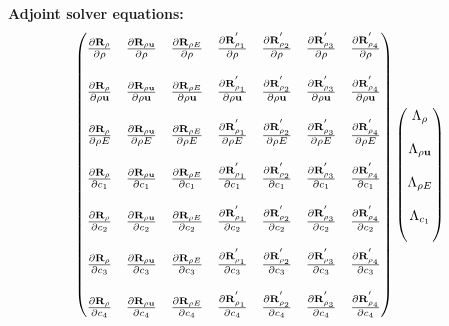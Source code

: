 \documentclass[a4paper]{article}
\begin{document}
\begin{landscape}
\begin{huge}
  \newpage
  \bf{Adjoint solver equations:}
  \begin{equation}
    \begin{pmatrix}
      \rdiff{\rho}{\rho}     & \rdiff{\rho \vu}{\rho}     & \rdiff{\rho E}{\rho}     & \rpdiff{\rho_1}{\rho}     & \rpdiff{\rho_2}{\rho}     & \rpdiff{\rho_3}{\rho}     & \rpdiff{\rho_4}{\rho}       \\ \\
      \rdiff{\rho}{\rho \vu} & \rdiff{\rho \vu}{\rho \vu} & \rdiff{\rho E}{\rho \vu} & \rpdiff{\rho_1}{\rho \vu} & \rpdiff{\rho_2}{\rho \vu} & \rpdiff{\rho_3}{\rho \vu} & \rpdiff{\rho_4}{\rho \vu}   \\ \\
      \rdiff{\rho}{\rho E}   & \rdiff{\rho \vu}{\rho E}   & \rdiff{\rho E}{\rho E}   & \rpdiff{\rho_1}{\rho E}   & \rpdiff{\rho_2}{\rho E}   & \rpdiff{\rho_3}{\rho E}   & \rpdiff{\rho_4}{\rho E}     \\ \\
      \rdiff{\rho}{c_1}      & \rdiff{\rho \vu}{c_1}      & \rdiff{\rho E}{c_1}      & \rpdiff{\rho_1}{c_1}      & \rpdiff{\rho_2}{c_1}      & \rpdiff{\rho_3}{c_1}      & \rpdiff{\rho_4}{c_1}        \\ \\
      \rdiff{\rho}{c_2}      & \rdiff{\rho \vu}{c_2}      & \rdiff{\rho E}{c_2}      & \rpdiff{\rho_1}{c_2}      & \rpdiff{\rho_2}{c_2}      & \rpdiff{\rho_3}{c_2}      & \rpdiff{\rho_4}{c_2}        \\ \\
      \rdiff{\rho}{c_3}      & \rdiff{\rho \vu}{c_3}      & \rdiff{\rho E}{c_3}      & \rpdiff{\rho_1}{c_3}      & \rpdiff{\rho_2}{c_3}      & \rpdiff{\rho_3}{c_3}      & \rpdiff{\rho_4}{c_3}        \\ \\
      \rdiff{\rho}{c_4}      & \rdiff{\rho \vu}{c_4}      & \rdiff{\rho E}{c_4}      & \rpdiff{\rho_1}{c_4}      & \rpdiff{\rho_2}{c_4}      & \rpdiff{\rho_3}{c_4}      & \rpdiff{\rho_4}{c_4}
    \end{pmatrix}
    \begin{pmatrix}
      \adjlam{\rho} \\ \\
      \adjlam{\rho \vu} \\ \\
      \adjlam{\rho E} \\ \\
      \adjlam{c_1} \\ \\

\end{pmatrix}
\end{equation}
\end{huge}
\end{landscape}
\end{document}
